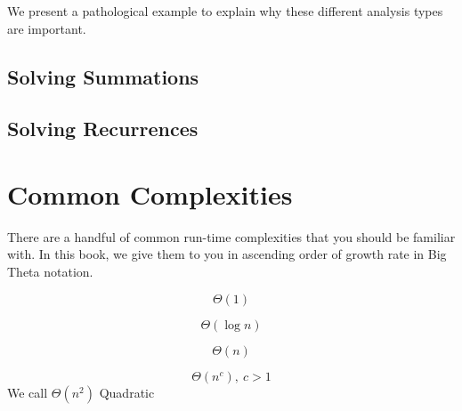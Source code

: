 \documentclass[main.tex]{subfiles}
\begin{document}
We present a pathological example to explain why these different analysis types are important.



\subsection{Solving Summations}


\subsection{Solving Recurrences}


\section{Common Complexities}

There are a handful of common run-time complexities that you should be familiar with. In this book, we give them to you in ascending order of growth rate in Big Theta notation.

\begin{defn}[Constant]
	\[\Theta(1)\]
\end{defn}

\begin{defn}[Logarithmic]
	\[\Theta(\log n)\]
\end{defn}

\begin{defn}[Linear]
	\[\Theta(n)\]
\end{defn}

\begin{defn}[Polynomial]
	\[\Theta(n^c),\ c > 1\]
	We call \(\Theta(n^2)\) Quadratic
\end{defn}
\end{document}
